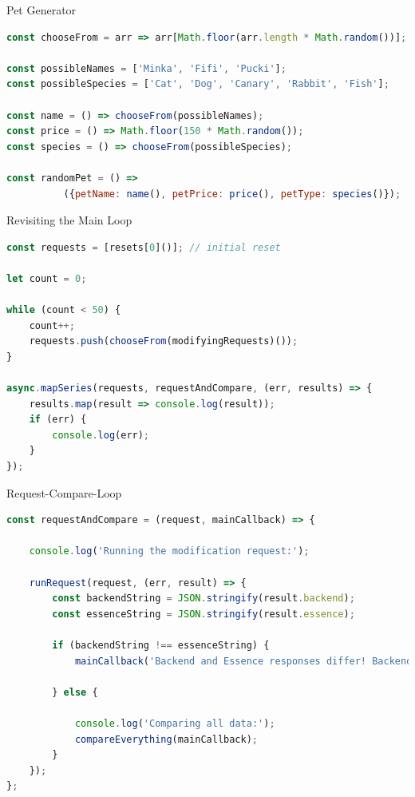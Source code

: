 \begin{frame}[fragile]{Pet Generator}

\begin{lstlisting}[language=JavaScript]
const chooseFrom = arr => arr[Math.floor(arr.length * Math.random())];

const possibleNames = ['Minka', 'Fifi', 'Pucki'];
const possibleSpecies = ['Cat', 'Dog', 'Canary', 'Rabbit', 'Fish'];

const name = () => chooseFrom(possibleNames);
const price = () => Math.floor(150 * Math.random());
const species = () => chooseFrom(possibleSpecies);

const randomPet = () => 
          ({petName: name(), petPrice: price(), petType: species()});
\end{lstlisting}

\end{frame}

\begin{frame}[fragile]{Revisiting the Main Loop}

\begin{lstlisting}[language=JavaScript]
const requests = [resets[0]()]; // initial reset

let count = 0;

while (count < 50) {
    count++;
    requests.push(chooseFrom(modifyingRequests)());
}

async.mapSeries(requests, requestAndCompare, (err, results) => {
    results.map(result => console.log(result));
    if (err) {
        console.log(err);
    }
});
\end{lstlisting}

\end{frame}

\begin{frame}[fragile]{Request-Compare-Loop}

\begin{lstlisting}[language=JavaScript]
const requestAndCompare = (request, mainCallback) => {

    console.log('Running the modification request:');

    runRequest(request, (err, result) => {
        const backendString = JSON.stringify(result.backend);
        const essenceString = JSON.stringify(result.essence);
        
        if (backendString !== essenceString) {
            mainCallback('Backend and Essence responses differ! Backend: ' + backendString + ' - Essence: ' + essenceString);
            
        } else {
            
            console.log('Comparing all data:');
            compareEverything(mainCallback);
        }
    });
};
\end{lstlisting}

\end{frame}



